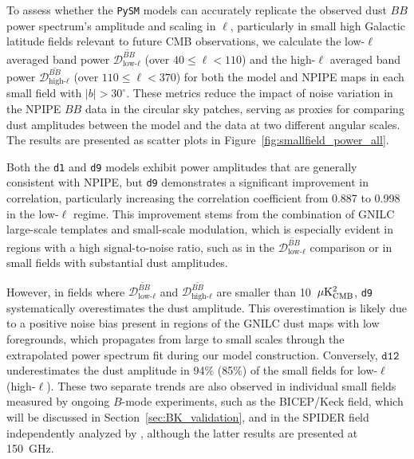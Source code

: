 \documentclass[twocolumn]{aastex631}
\begin{document}
To assess whether the \texttt{PySM} models can accurately replicate the observed dust $BB$ power spectrum's amplitude and scaling in $\ell$, particularly in small high Galactic latitude fields relevant to future CMB observations, we calculate the low-$\ell$ averaged band power $\overline{\mathcal{D}_{\text{low-}\ell}^{BB}}$ (over $40 \le \ell < 110$) and the high-$\ell$ averaged band power $\overline{\mathcal{D}_{\text{high-}\ell}^{BB}}$ (over $110 \le \ell < 370$) for both the model and NPIPE maps in each small field with $|b| > 30^\circ$. These metrics reduce the impact of noise variation in the NPIPE $BB$ data in the circular sky patches, serving as proxies for comparing dust amplitudes between the model and the data at two different angular scales. The results are presented as scatter plots in Figure~\ref{fig:smallfield_power_all}.

Both the \texttt{d1} and \texttt{d9} models exhibit power amplitudes that are generally consistent with NPIPE, but \texttt{d9} demonstrates a significant improvement in correlation, particularly increasing the correlation coefficient from 0.887 to 0.998 in the low-$\ell$ regime. This improvement stems from the combination of GNILC large-scale templates and small-scale modulation, which is especially evident in regions with a high signal-to-noise ratio, such as in the $\overline{\mathcal{D}_{\text{low-}\ell}^{BB}}$ comparison or in small fields with substantial dust amplitudes. 

However, in fields where $\overline{\mathcal{D}_{\text{low-}\ell}^{BB}}$ and $\overline{\mathcal{D}_{\text{high-}\ell}^{BB}}$ are smaller than 10~$\mu\rm{K^2_{CMB}}$, \texttt{d9} systematically overestimates the dust amplitude. This overestimation is likely due to a positive noise bias present in regions of the GNILC dust maps with low foregrounds, which propagates from large to small scales through the extrapolated power spectrum fit during our model construction. Conversely, $\texttt{d12}$ underestimates the dust amplitude in 94\% (85\%) of the small fields for low-$\ell$ (high-$\ell$). These two separate trends are also observed in individual small fields measured by ongoing $B$-mode experiments, such as the BICEP/Keck field, which will be discussed in Section~\ref{sec:BK_validation}, and in the SPIDER field independently analyzed by \cite{SPIDERCollaboration:2024}, although the latter results are presented at 150~GHz. 
\end{document}
